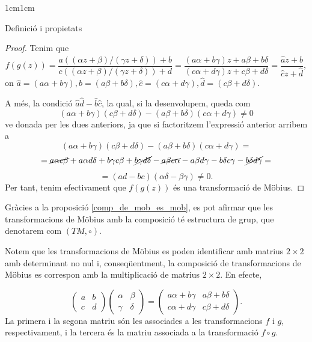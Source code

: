 \begin{adjustwidth}{1cm}{1cm}
\begin{subsection}{Definició i propietats}
    \begin{proof}
        Tenim que 
        \[
            f(g(z))=\frac{a((\alpha z+\beta)/(\gamma z+\delta))+b}{c((\alpha z+\beta)/(\gamma z+\delta))+d}=\frac{(a\alpha+b\gamma)z+a\beta+b\delta}{(c\alpha+d\gamma)z+c\beta+d\delta}=\frac{\hat{a}z+\hat{b}}{\hat{c}z+\hat{d}},
        \]
        on $\hat{a}=(a\alpha+b\gamma), \hat{b}=(a\beta+b\delta), \hat{c}=(c\alpha+d\gamma), \hat{d}=(c\beta+d\delta)$.

        A més, la condició $\hat{a}\hat{d}-\hat{b}\hat{c}$, la qual, si la desenvolupem, queda com
        \[
            (a\alpha+b\gamma)(c\beta+d\delta)-(a\beta+b\delta)(c\alpha+d\gamma) \neq 0
        \]
        ve donada per les dues anteriors, ja que si factoritzem l'expressió anterior arribem a 
        \[
            (a\alpha+b\gamma)(c\beta+d\delta)-(a\beta+b\delta)(c\alpha+d\gamma)=
         \]
         \[
            =\cancel{a\alpha c\beta}+a\alpha d\delta +b\gamma c\beta +\cancel{b\gamma d\delta}-\cancel{a\beta c\alpha}-a\beta d\gamma-b\delta c\gamma-\cancel{b\delta d\gamma}=
         \]
         \[   
            =(ad-bc)(\alpha\delta-\beta\gamma) \neq 0.
        \]
        Per tant, tenim efectivament que $f(g(z))$ és una transformació de Möbius.
    \end{proof}

    \begin{nota}
         Gràcies a la proposició \ref{comp_de_mob_es_mob}, es pot afirmar que les transformacions de Möbius amb la composició té estructura de grup, que denotarem com $(TM,\circ)$.
    \end{nota}
   
    Notem que les transformacions de Möbius es poden identificar amb matrius $2\times2$ amb determinant no nul i, conseqüentment, la composició de transformacions de Möbius es correspon amb la multiplicació de matrius $2\times 2$. En efecte, 

    \[
        \begin{pmatrix}
            a & b \\
            c & d
        \end{pmatrix}
        \begin{pmatrix}
            \alpha & \beta \\
            \gamma & \delta
        \end{pmatrix} = 
        \begin{pmatrix}
            a\alpha+b\gamma & a\beta+b\delta \\
            c\alpha+d\gamma & c\beta+d\delta
        \end{pmatrix}.
    \]
    La primera i la segona matriu són les associades a les transformacions $f$ i $g$, respectivament, i la tercera és la matriu associada a la transformació $f \circ g$.


\end{subsection}
\end{adjustwidth}
